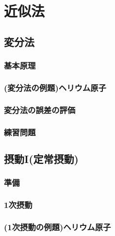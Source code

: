 \documentclass{report}
\begin{document}
  
  \maketitle
  \tableofcontents
  \chapter{近似法}
    \section{変分法}
      
      \subsection{基本原理}
        
      \subsection{(変分法の例題)ヘリウム原子}
        
      \subsection{変分法の誤差の評価}
        
      \subsection{練習問題}
        
    \section{摂動I(定常摂動)}
      
      \subsection{準備}
        
      \subsection{1次摂動}
        
      \subsection{(1次摂動の例題)ヘリウム原子}
        
\end{document}
